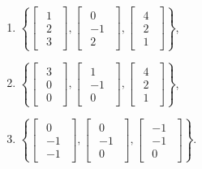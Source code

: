 \documentclass{article}
\begin{document}
\begin{enumerate}
\begin{enumerate}
            \item $\left\{ \begin{bmatrix}\begin{array}{r} 1\\ 2\\ 3 \end{array}\end{bmatrix},          \begin{bmatrix}\begin{array}{r} 0\\ -1\\ 2 \end{array}\end{bmatrix}, 
            \begin{bmatrix}\begin{array}{r} 4\\ 2\\ 1 \end{array}\end{bmatrix}\right\}$,

            \item $\left\{ \begin{bmatrix}\begin{array}{r} 3\\ 0\\ 0 \end{array}\end{bmatrix},          \begin{bmatrix}\begin{array}{r} 1\\ -1\\ 0 \end{array}\end{bmatrix}, 
            \begin{bmatrix}\begin{array}{r} 4\\ 2\\ 1 \end{array}\end{bmatrix}\right\}$,

            \item $\left\{ \begin{bmatrix}\begin{array}{r} 0\\ -1\\ -1 \end{array}\end{bmatrix},          \begin{bmatrix}\begin{array}{r} 0\\ -1\\ 0 \end{array}\end{bmatrix}, 
            \begin{bmatrix}\begin{array}{r} -1\\ -1\\ 0 \end{array}\end{bmatrix}\right\}$.
        \end{enumerate}
        

\end{enumerate}
\end{document}
